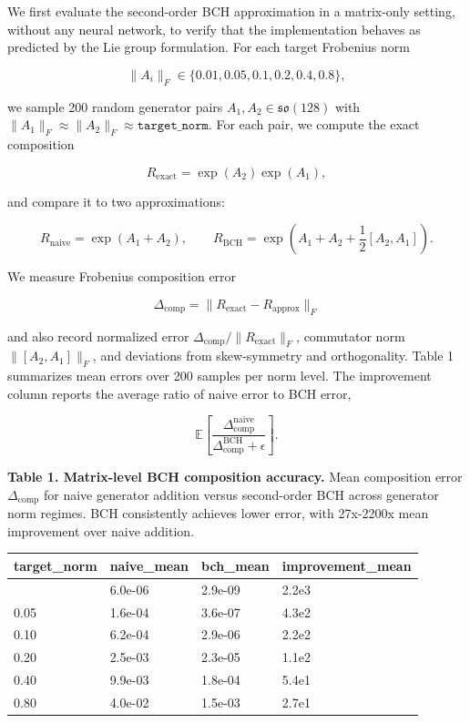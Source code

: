 \documentclass[
]{article}
\newcounter{none} %
\begin{document}
We first evaluate the second-order BCH approximation in a matrix-only setting, without any neural network, to verify that the implementation behaves as predicted by the Lie group formulation. For each target Frobenius norm

\[
\|A_i\|_F\in\{0.01,0.05,0.1,0.2,0.4,0.8\},
\]

we sample 200 random generator pairs \(A_1,A_2\in\mathfrak{so}(128)\) with \(\|A_1\|_F\approx\|A_2\|_F\approx\texttt{target\_norm}\). For each pair, we compute the exact composition

\[
R_{\mathrm{exact}}=\exp(A_2)\exp(A_1),
\]

and compare it to two approximations:

\[
R_{\mathrm{naive}}=\exp(A_1+A_2),
\qquad
R_{\mathrm{BCH}}=
\exp\left(A_1+A_2+\frac{1}{2}[A_2,A_1]\right).
\]

We measure Frobenius composition error

\[
\Delta_{\mathrm{comp}}=\|R_{\mathrm{exact}}-R_{\mathrm{approx}}\|_F
\]

and also record normalized error \(\Delta_{\mathrm{comp}}/\|R_{\mathrm{exact}}\|_F\), commutator norm \(\|[A_2,A_1]\|_F\), and deviations from skew-symmetry and orthogonality. Table 1 summarizes mean errors over 200 samples per norm level. The improvement column reports the average ratio of naive error to BCH error,

\[
\mathbb{E}\left[
\frac{\Delta_{\mathrm{comp}}^{\mathrm{naive}}}
{\Delta_{\mathrm{comp}}^{\mathrm{BCH}}+\epsilon}
\right].
\]

\textbf{Table 1. Matrix-level BCH composition accuracy.} Mean composition error \(\Delta_{\mathrm{comp}}\) for naive generator addition versus second-order BCH across generator norm regimes. BCH consistently achieves lower error, with 27x-2200x mean improvement over naive addition.

{\def\LTcaptype{none} %
\begin{longtable}[]{@{}llll@{}}
\toprule\noalign{}
target\_norm & naive\_mean & bch\_mean & improvement\_mean \\
\midrule\noalign{}
\endhead
\bottomrule\noalign{}
\endlastfoot
0.01 & 6.0e-06 & 2.9e-09 & 2.2e3 \\
0.05 & 1.6e-04 & 3.6e-07 & 4.3e2 \\
0.10 & 6.2e-04 & 2.9e-06 & 2.2e2 \\
0.20 & 2.5e-03 & 2.3e-05 & 1.1e2 \\
0.40 & 9.9e-03 & 1.8e-04 & 5.4e1 \\
0.80 & 4.0e-02 & 1.5e-03 & 2.7e1 \\
\end{longtable}
}
\end{document}
